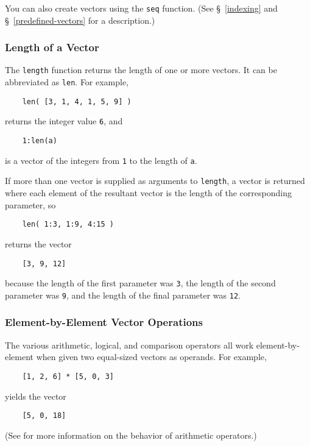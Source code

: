 You can
also create vectors using the {\tt seq} function.  (See
\S~\ref{indexing} and \S~\ref{predefined-vectors} for a
description.)

\subsubsection{Length of a Vector}
\label{vector-length}

The {\tt length}
function returns the length of one or more vectors.
It
can be abbreviated as {\tt len}.  For example,
\begin{verbatim}
    len( [3, 1, 4, 1, 5, 9] )
\end{verbatim}
returns the integer value {\tt 6}, and
\begin{verbatim}
    1:len(a)
\end{verbatim}
is a vector of the integers from {\tt 1} to the length of {\tt a}.

If
more than one vector is supplied as arguments to {\tt length}, a 
vector is returned where each element of the resultant vector is 
the length of the corresponding parameter, so
\begin{verbatim}
    len( 1:3, 1:9, 4:15 )
\end{verbatim}
returns the vector
\begin{verbatim}
    [3, 9, 12]
\end{verbatim}
because the length of the first parameter was {\tt 3},
the length of the second parameter was {\tt 9}, and the
length of the final parameter was {\tt 12}.

\subsubsection{Element-by-Element Vector Operations}
\label{element-by-element}

The various
arithmetic, logical, and comparison operators all work
element-by-element when given two equal-sized vectors as operands.
For example,
\begin{verbatim}
    [1, 2, 6] * [5, 0, 3]
\end{verbatim}
yields the vector
\begin{verbatim}
    [5, 0, 18]
\end{verbatim}
(See 
for more information on the behavior of arithmetic operators.)

